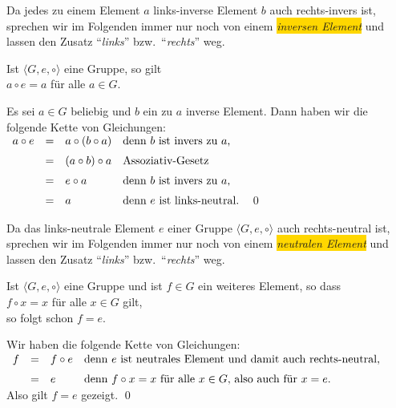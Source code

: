 \remark
Da jedes zu einem Element $a$ links-inverse Element $b$ auch rechts-invers ist, sprechen wir im Folgenden
immer nur noch von einem \colorbox{gold}{\emph{inversen Element}} und lassen den Zusatz
``\emph{links}'' bzw.~``\emph{rechts}'' weg.  
\eox

\begin{Satz} \lb
  Ist $\langle G, e, \circ \rangle$ eine Gruppe, so gilt
  \\[0.2cm]
  \hspace*{1.3cm}
  $a \circ e = a$ \quad f\"{u}r alle $a \in G$.
\end{Satz}

\proof
Es sei $a \in G$ beliebig und $b$ ein zu $a$ inverse Element.  Dann haben wir die folgende Kette von
Gleichungen:
\\[0.2cm]
\hspace*{1.3cm}
$
\begin{array}[b]{lcll}
  a \circ e & = & a \circ (b \circ a) 
                & \mbox{denn $b$ ist invers zu $a$,} \\[0.2cm]
            & = & (a \circ b) \circ a
                & \mbox{Assoziativ-Gesetz} \\[0.2cm]
            & = & e \circ a
                & \mbox{denn $b$ ist invers zu $a$,} \\[0.2cm]
            & = & a 
                & \mbox{denn $e$ ist links-neutral.}
\end{array}
$
\qed
\pagebreak

\remark
Da das links-neutrale Element $e$ einer Gruppe $\langle G, e, \circ \rangle$ auch rechts-neutral ist,
sprechen wir im Folgenden
immer nur noch von einem \colorbox{gold}{\emph{neutralen Element}} und lassen den Zusatz
``\emph{links}'' bzw.~``\emph{rechts}'' weg. 
\eox

\begin{Satz} \lb
  Ist $\langle G, e, \circ \rangle$ eine Gruppe und ist $f \in G$ ein weiteres  Element, so dass
  \\[0.2cm]
  \hspace*{1.3cm}
  $f \circ x = x$ \quad f\"{u}r alle $x \in G$ gilt,
  \\[0.2cm]
  so folgt schon $f = e$.
\end{Satz}

\proof
Wir haben die folgende Kette von Gleichungen:
\\[0.2cm]
\hspace*{1.3cm}
$
\begin{array}[t]{lcll}
  f & = & f \circ e & \mbox{denn $e$ ist neutrales Element und damit auch rechts-neutral,} \\[0.2cm]
    & = & e         & \mbox{denn $f \circ x = x$ f\"{u}r alle $x \in G$, also auch f\"{u}r $x = e$.} 
\end{array}
$
\\[0.2cm]
Also gilt $f = e$ gezeigt. \qed

